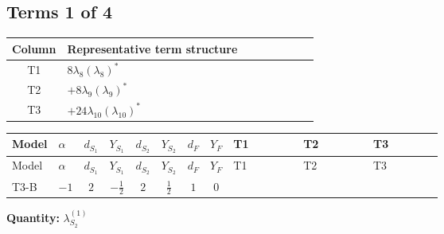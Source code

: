 \documentclass[8pt]{article}
\begin{document}
\begin{landscape}
\subsection*{Terms 1 of 4}
\begin{center}
\begin{tabular}{@{}c >{\raggedright\arraybackslash}p{0.82\linewidth}@{}}
\toprule
Column & Representative term structure \\
\midrule
T1 & \(\displaystyle 8 {\lambda_8} \left({\lambda_8}\right)^{*}\) \\
\midrule
T2 & \(\displaystyle +8 {\lambda_9} \left({\lambda_9}\right)^{*}\) \\
\midrule
T3 & \(\displaystyle +24 {\lambda_{10}} \left({\lambda_{10}}\right)^{*}\) \\
\midrule
\bottomrule
\end{tabular}
\end{center}
\smallskip
\tiny
\begin{longtable}{@{}llcccccc >{\raggedright\arraybackslash}p{0.21\linewidth} >{\raggedright\arraybackslash}p{0.21\linewidth} >{\raggedright\arraybackslash}p{0.21\linewidth}@{}}
\toprule
Model & $\alpha$ & $d_{S_1}$ & $Y_{S_1}$ & $d_{S_2}$ & $Y_{S_2}$ & $d_F$ & $Y_F$ & T1 & T2 & T3 \\
\midrule
\endfirsthead
\toprule
Model & $\alpha$ & $d_{S_1}$ & $Y_{S_1}$ & $d_{S_2}$ & $Y_{S_2}$ & $d_F$ & $Y_F$ & T1 & T2 & T3 \\
\midrule
\endhead
T3-B & $-1$ & $2$ & $-\frac{1}{2}$ & $2$ & $\frac{1}{2}$ & $1$ & $0$ & \scriptsize\adjustbox{max width=\linewidth}{$\begin{gathered} 8 {\lambda_8} \left({\lambda_8}\right)^{*}\end{gathered}$} & \scriptsize\adjustbox{max width=\linewidth}{$\begin{gathered} +8 {\lambda_9} \left({\lambda_9}\right)^{*}\end{gathered}$} & \scriptsize\adjustbox{max width=\linewidth}{$\begin{gathered} +24 {\lambda_{10}} \left({\lambda_{10}}\right)^{*}\end{gathered}$} \\
\midrule
\bottomrule
\end{longtable}
\clearpage
\noindent\textbf{Quantity: }$\lambda_{S_2}^{(1)}$\par\smallskip

\end{landscape}
\end{document}
